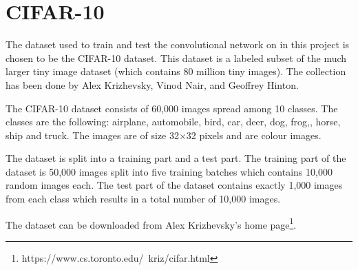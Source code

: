 \graphicspath{{Chapters/Project/}}

\section{CIFAR-10} %
\label{sec:cifar_10}

The dataset used to train and test the convolutional network on in this project
is chosen to be the CIFAR-10 dataset. This dataset is a labeled subset of the
much larger tiny image dataset (which contains 80 million tiny images). The
collection has been done by Alex Krizhevsky, Vinod Nair, and Geoffrey Hinton.

The CIFAR-10 dataset consists of 60,000 images spread among 10 classes. The classes are the following: airplane, automobile, bird, car, deer, dog, frog,, horse, ship and truck. The images are of size 32$\times$32 pixels and are colour images.

The dataset is split into a training part and a test part. The training part of the dataset is 50,000 images split into five training batches which contains 10,000 random images each. The test part of the dataset contains exactly 1,000 images from each class which results in a total number of 10,000 images.

The dataset can be downloaded from Alex Krizhevsky's home page\footnote{https://www.cs.toronto.edu/~kriz/cifar.html}.

